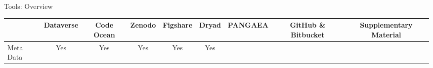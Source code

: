 \documentclass[ignorenonframetext,]{beamer}
\begin{document}
\begin{frame}{Tools: Overview}
\protect\hypertarget{tools-overview}{}

\begin{longtable}[]{@{}lcccccccc@{}}
\toprule
\begin{minipage}[b]{0.12\columnwidth}\raggedright
\strut
\end{minipage} & \begin{minipage}[b]{0.05\columnwidth}\centering
Dataverse\strut
\end{minipage} & \begin{minipage}[b]{0.05\columnwidth}\centering
Code Ocean\strut
\end{minipage} & \begin{minipage}[b]{0.05\columnwidth}\centering
Zenodo\strut
\end{minipage} & \begin{minipage}[b]{0.07\columnwidth}\centering
Figshare\strut
\end{minipage} & \begin{minipage}[b]{0.04\columnwidth}\centering
Dryad\strut
\end{minipage} & \begin{minipage}[b]{0.06\columnwidth}\centering
PANGAEA\strut
\end{minipage} & \begin{minipage}[b]{0.15\columnwidth}\centering
GitHub \& Bitbucket\strut
\end{minipage} & \begin{minipage}[b]{0.18\columnwidth}\centering
Supplementary Material\strut
\end{minipage}\tabularnewline
\midrule
\endhead
\begin{minipage}[t]{0.12\columnwidth}\raggedright
Meta Data\strut
\end{minipage} & \begin{minipage}[t]{0.05\columnwidth}\centering
Yes\strut
\end{minipage} & \begin{minipage}[t]{0.05\columnwidth}\centering
Yes\strut
\end{minipage} & \begin{minipage}[t]{0.05\columnwidth}\centering
Yes\strut
\end{minipage} & \begin{minipage}[t]{0.07\columnwidth}\centering
Yes\strut
\end{minipage} & \begin{minipage}[t]{0.04\columnwidth}\centering
Yes\strut

\end{minipage}
\end{longtable}
\end{frame}
\end{document}
